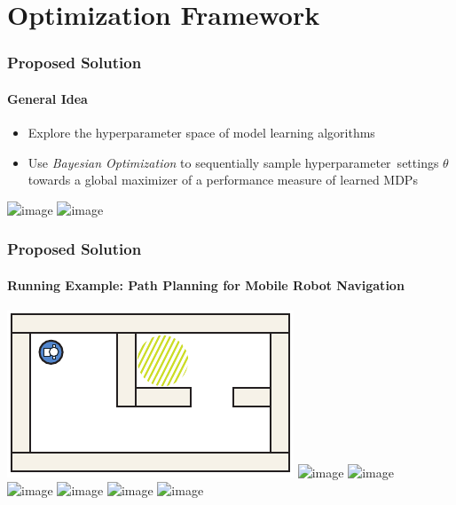 \section{Optimization Framework}

\begin{frame}[t]
\frametitle{Proposed Solution}
\framesubtitle{General Idea}

\begin{itemize}
	\item<1-> Explore the hyperparameter space of model learning algorithms
	\item<2-> Use \textit{Bayesian Optimization} to sequentially sample hyperparameter~settings $\theta$ towards a global maximizer of a performance measure of learned MDPs
\end{itemize}

\begin{center}
	\includegraphics<-2>[width=\textwidth]{figures/bo_toy_example_v2_transparent}
	\includegraphics<3->[width=\textwidth]{figures/bo_toy_example_v2}
\end{center}

\end{frame}

\begin{frame}
\frametitle{Proposed Solution}
\framesubtitle{Running Example: Path Planning for Mobile Robot Navigation}

\centering
\includegraphics[width=.3\textwidth]{figures/dummy-map-2-1}
\qquad
\includegraphics<-1| handout:0>[width=.3\textwidth]{figures/dummy-map-2-2-transparent}
\includegraphics<2->[width=.3\textwidth]{figures/dummy-map-2-2v2}\\\vspace{8pt}
\includegraphics<-2| handout:0>[width=.3\textwidth]{figures/dummy-map-2-3-transparent}
\includegraphics<3->[width=.3\textwidth]{figures/dummy-map-2-3} \qquad
\includegraphics<-3| handout:0>[width=.3\textwidth]{figures/dummy-map-2-4-transparent} \includegraphics<4->[width=.3\textwidth]{figures/dummy-map-2-4}


\end{frame}

